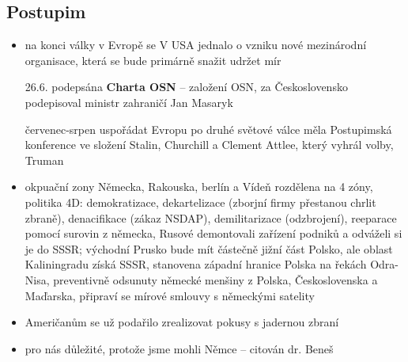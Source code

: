 \documentclass{article}
\begin{document}
\subsection*{Postupim}
\begin{itemize}
    \item na konci války v Evropě se V USA jednalo o vzniku nové mezinárodní organisace, která se bude primárně snažit udržet mír
    \item[26.6.] podepsána \textbf{Charta OSN} -- založení OSN, za Československo podepisoval ministr zahraničí Jan Masaryk
    \item[červenec-srpen] uspořádat Evropu po druhé světové válce měla Postupimská konference ve složení Stalin, Churchill a Clement Attlee, který vyhrál volby, Truman
    \item okpuační zony Německa, Rakouska, berlín a Vídeň rozdělena na 4 zóny, politika 4D: demokratizace, dekartelizace (zborjní firmy přestanou chrlit zbraně), denacifikace (zákaz NSDAP), demilitarizace (odzbrojení), reeparace pomocí surovin z německa, Rusové demontovali zařízení podniků a odváželi si je do SSSR; východní Prusko bude mít částečně jižní část Polsko, ale oblast Kaliningradu získá SSSR, stanovena západní hranice Polska na řekách Odra-Nisa, preventivně odsunuty německé menšiny z Polska, Československa a Maďarska, připraví se mírové smlouvy s německými satelity
    \item Američanům se už podařilo zrealizovat pokusy s jadernou zbraní
    \item pro nás důležité, protože jsme mohli  Němce -- citován dr. Beneš
\end{itemize}
\end{document}
